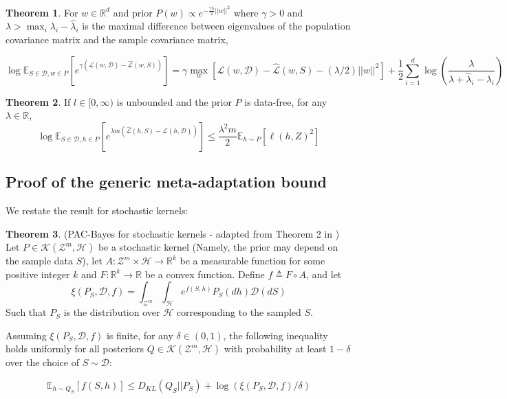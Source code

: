 \documentclass{article}
\theoremstyle{definition}
\newtheorem{theorem}{Theorem}[section]
\newcommand{\Expect}[2]{\mathbb{E}_{#1}\left [#2 \right ]}
\begin{document}
\begin{theorem} \citep{Rivasplata2020}
	For $w\in\mathbb{R}^d$ and prior $P(w)\propto e^{-\frac{\gamma\lambda}{2}||w||^2}$ where $\gamma>0$ and $\lambda>\max_i{\lambda_i-\hat{\lambda}_i}$ is the maximal difference between eigenvalues of the population covariance matrix and the sample covariance matrix,
	
	$$\log \Expect{S\in \mathcal{D}, w\in P}{e^{\gamma(\mathcal{L}(w,\mathcal{D})-\hat{\mathcal{L}}(w,S))}} = \gamma\max_w{\left [\mathcal{L}(w,\mathcal{D})-\hat{\mathcal{L}}(w,S)-(\lambda/2)||w||^2\right ]} + \frac{1}{2}\sum_{i=1}^{d}\log\left (\frac{\lambda}{\lambda+\hat{\lambda}_i-\lambda_i} \right ) $$
\end{theorem}

\begin{theorem} \citep{Rivasplata2020}
	If $l\in[0,\infty)$ is unbounded and the prior $P$ is data-free, for any $\lambda\in \mathbb{R}$,
	$$\log \Expect{S\in \mathcal{D}, h\in P}{e^{\lambda m(\hat{\mathcal{L}}(h,S)-\mathcal{L}(h,\mathcal{D}))}} \leq \frac{\lambda^2m}{2}\Expect{h\sim P}{\ell(h,Z)^2}$$
\end{theorem}

\subsection{Proof of the generic meta-adaptation bound} \label{append:proof-main-result}

We restate the result for stochastic kernels:

\begin{theorem} (PAC-Bayes for stochastic kernels - adapted from Theorem 2 in \citet{Rivasplata2020}) \label{thm:rivasplata-pb-appendix}
	Let $P\in \mathcal{K}(\mathcal{Z}^m, \mathcal{H})$ be a stochastic kernel (Namely, the prior may depend on the sample data $S$), let $A: \mathcal{Z}^m\times \mathcal{H}\rightarrow \mathbb{R}^k$ be a measurable function for some positive integer $k$ and $F:\mathbb{R}^k\rightarrow \mathbb{R}$ be a convex function.
	Define $f\triangleq F\circ A$, and let 
	$$\xi(P_S, \mathcal{D}, f)=\int_{\mathcal{Z}^m}\int_{\mathcal{H}}e^{f(S, h)}P_S(dh)\mathcal{D}(dS)$$
	Such that $P_S$ is the distribution over $\mathcal{H}$ corresponding to the sampled $S$.
	
	Assuming $\xi(P_S, \mathcal{D}, f)$ is finite, for any $\delta \in (0,1)$, the following inequality holds uniformly for all posteriors $Q\in \mathcal{K}(\mathcal{Z}^m, \mathcal{H})$ with probability at least $1-\delta$ over the choice of $S\sim \mathcal{D}$:
	
	\begin{equation} \label{eq:ribasplata-pb-appendix}
	\Expect{h\sim Q_S}{f(S, h)} \leq D_{KL}(Q_S||P_S)+\log\left (\xi(P_S, \mathcal{D}, f)/\delta\right )
	\end{equation}
\end{theorem}
\end{document}
